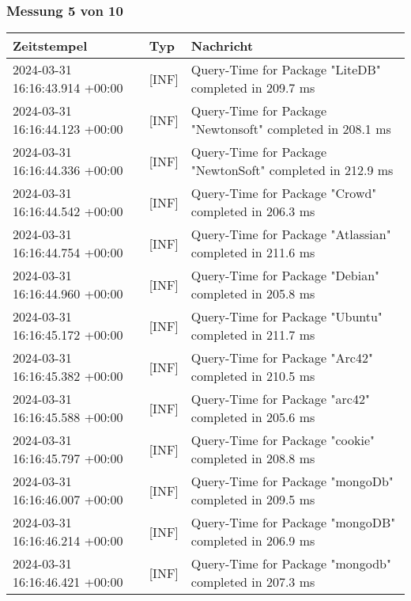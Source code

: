         \subsubsection*{Messung 5 von 10} \label{subsubsec:MySQLOhneIndex5von10}
        {
            {\small
                \begin{tabularx}{\textwidth}{|l|l|X|}
                    \hline
                    \textbf{Zeitstempel} & \textbf{Typ} & \textbf{Nachricht} \\
                    \hline
                    \endhead
                    2024-03-31 16:16:43.914 +00:00 & [INF] & Query-Time for Package "LiteDB" completed in 209.7 ms \\
                    2024-03-31 16:16:44.123 +00:00 & [INF] & Query-Time for Package "Newtonsoft" completed in 208.1 ms \\
                    2024-03-31 16:16:44.336 +00:00 & [INF] & Query-Time for Package "NewtonSoft" completed in 212.9 ms \\
                    2024-03-31 16:16:44.542 +00:00 & [INF] & Query-Time for Package "Crowd" completed in 206.3 ms \\
                    2024-03-31 16:16:44.754 +00:00 & [INF] & Query-Time for Package "Atlassian" completed in 211.6 ms \\
                    2024-03-31 16:16:44.960 +00:00 & [INF] & Query-Time for Package "Debian" completed in 205.8 ms \\
                    2024-03-31 16:16:45.172 +00:00 & [INF] & Query-Time for Package "Ubuntu" completed in 211.7 ms \\
                    2024-03-31 16:16:45.382 +00:00 & [INF] & Query-Time for Package "Arc42" completed in 210.5 ms \\
                    2024-03-31 16:16:45.588 +00:00 & [INF] & Query-Time for Package "arc42" completed in 205.6 ms \\
                    2024-03-31 16:16:45.797 +00:00 & [INF] & Query-Time for Package "cookie" completed in 208.8 ms \\
                    2024-03-31 16:16:46.007 +00:00 & [INF] & Query-Time for Package "mongoDb" completed in 209.5 ms \\
                    2024-03-31 16:16:46.214 +00:00 & [INF] & Query-Time for Package "mongoDB" completed in 206.9 ms \\
                    2024-03-31 16:16:46.421 +00:00 & [INF] & Query-Time for Package "mongodb" completed in 207.3 ms \\

\end{tabularx}}}
